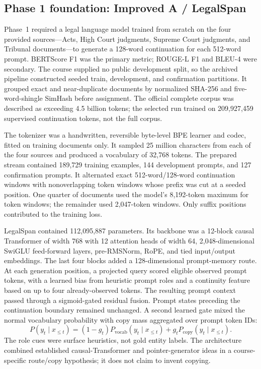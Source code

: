 
\subsection{Phase 1 foundation: Improved A / LegalSpan}
Phase~1 required a legal language model trained from scratch on the four
provided sources---Acts, High Court judgments, Supreme Court judgments, and
Tribunal documents---to generate a 128-word continuation for each 512-word
prompt. BERTScore F1 was the primary metric; ROUGE-L F1 and BLEU-4 were
secondary. The course supplied no public development split, so the archived
pipeline constructed seeded train, development, and confirmation partitions.
It grouped exact and near-duplicate documents by normalized SHA-256 and
five-word-shingle SimHash before assignment. The official complete corpus was
described as exceeding 4.5 billion tokens; the selected run trained on
209,927,459 supervised continuation tokens, not the full corpus.

The tokenizer was a handwritten, reversible byte-level BPE learner and codec,
fitted on training documents only. It sampled 25 million characters from each
of the four sources and produced a vocabulary of 32,768 tokens. The prepared
stream contained 189,729 training examples, 144 development prompts, and 127
confirmation prompts. It alternated exact 512-word/128-word continuation
windows with nonoverlapping token windows whose prefix was cut at a seeded
position. One quarter of documents used the model's 8,192-token maximum for
token windows; the remainder used 2,047-token windows. Only suffix positions
contributed to the training loss.

LegalSpan contained 112,095,887 parameters. Its backbone was a 12-block
causal Transformer of width 768 with 12 attention heads of width 64,
2,048-dimensional SwiGLU feed-forward layers, pre-RMSNorm, RoPE, and tied
input/output embeddings. The last four blocks added a 128-dimensional
prompt-memory route. At each generation position, a projected query scored
eligible observed prompt tokens, with a learned bias from heuristic prompt
roles and a continuity feature based on up to four already-observed tokens.
The resulting prompt context passed through a sigmoid-gated residual fusion.
Prompt states preceding the continuation boundary remained unchanged. A
second learned gate mixed the normal vocabulary probability with copy mass
aggregated over prompt token IDs:
\begin{equation}
P(y_t\mid x_{\leq t})=(1-g_t)P_{\mathrm{vocab}}(y_t\mid x_{\leq t})
 +g_tP_{\mathrm{copy}}(y_t\mid x_{\leq t}).
\end{equation}
The role cues were surface heuristics, not gold entity labels. The architecture
combined established causal-Transformer and pointer-generator ideas in a
course-specific route/copy hypothesis; it does not claim to invent copying.

